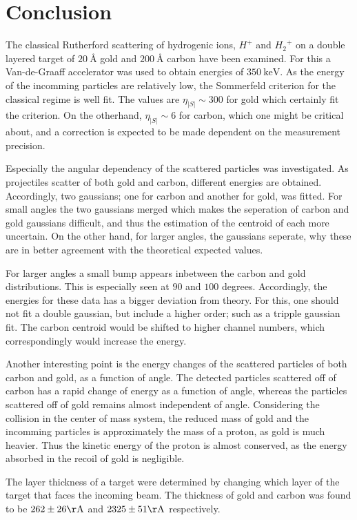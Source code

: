 \section{Conclusion}
The classical Rutherford scattering of hydrogenic ions, $H^+$ and ${H_2}^+$ on
a double layered target of $\SI{20}{\angstrom}$ gold and $\SI{200}{\angstrom}$
carbon have been examined.
For this a Van-de-Graaff accelerator was used to obtain energies of
$\SI{350}{\kilo\electronvolt}$. As the energy of the incomming particles are
relatively low, the Sommerfeld criterion for the classical regime is well fit.
The values are $\eta_|S| \sim 300$ for gold which certainly fit the criterion.
On the otherhand, $\eta_|S| \sim 6$ for carbon, which one might be critical
about, and a correction is expected to be made dependent on the measurement
precision.

Especially the angular dependency of the scattered particles was investigated.
As projectiles scatter of both gold and carbon, different energies are
obtained. Accordingly, two gaussians; one for carbon and another for gold, was
fitted. For small angles the two gaussians merged which makes the seperation of
carbon and gold gaussians difficult, and thus the estimation of the centroid of
each more uncertain. On the other hand, for larger angles, the gaussians
seperate, why these are in better agreement with the theoretical expected
values.

For larger angles a small bump appears inbetween the carbon and gold
distributions. This is especially seen at $90$ and $100$ degrees. Accordingly,
the energies for these data has a bigger deviation from theory. For this, one
should not fit a double gaussian, but include a higher order; such as a tripple
gaussian fit. The carbon centroid would be shifted to higher channel numbers,
which correspondingly would increase the energy. 

Another interesting point is the energy changes of the scattered particles of
both carbon and gold, as a function of angle. The detected particles scattered
off of carbon has a rapid change of energy as a function of angle, whereas the
particles scattered off of gold remains almost independent of angle.
Considering the collision in the center of mass system, the reduced mass of
gold and the incomming particles is approximately the mass of a proton, as gold
is much heavier. Thus the kinetic energy of the proton is almost conserved, as
the energy absorbed in the recoil of gold is negligible. 

The layer thickness of a target were determined by changing which layer of the target that faces the incoming beam. The thickness of gold and carbon was found to be $262\pm26\si{\AA}$ and $2325\pm51\si{\AA}$ respectively. 

\vfill


